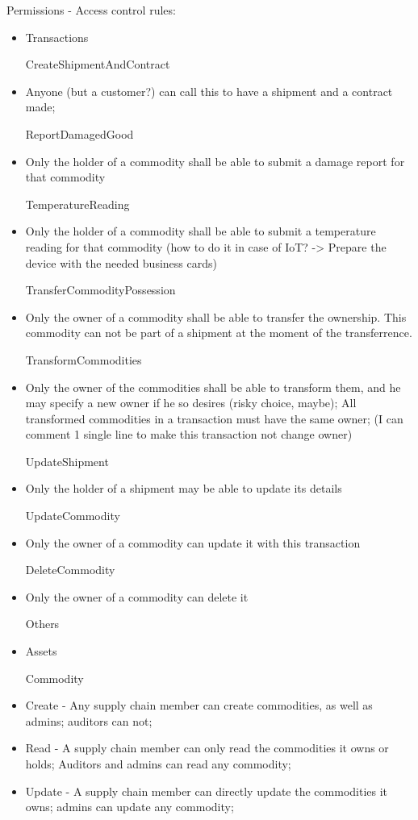Permissions - Access control rules:
\begin{itemize}
	\item Transactions
		\par CreateShipmentAndContract
			\item Anyone (but a customer?) can call this to have a shipment and a contract made;
		\par ReportDamagedGood
			\item Only the holder of a commodity shall be able to submit a damage report for that commodity
		\par TemperatureReading
			\item Only the holder of a commodity shall be able to submit a temperature reading for that commodity (how to do it in case of IoT? -> Prepare the device with the needed business cards)
		\par TransferCommodityPossession
			\item Only the owner of a commodity shall be able to transfer the ownership. This commodity can not be part of a shipment at the moment of the transferrence. 
		\par TransformCommodities
			\item Only the owner of the commodities shall be able to transform them, and he may specify a new owner if he so desires (risky choice, maybe); All transformed commodities in a transaction must have the same owner; (I can comment 1 single line to make this transaction not change owner)
		\par UpdateShipment
			\item Only the holder of a shipment may be able to update its details
		\par UpdateCommodity
			\item Only the owner of a commodity can update it with this transaction
		\par DeleteCommodity
			\item Only the owner of a commodity can delete it
		\par Others
	\item Assets
		\par Commodity
			\item Create - Any supply chain member can create commodities, as well as admins; auditors can not;
			\item Read - A supply chain member can only read the commodities it owns or holds; Auditors and admins can read any commodity;
			\item Update - A supply chain member can directly update the commodities it owns; admins can update any commodity;

\end{itemize}
